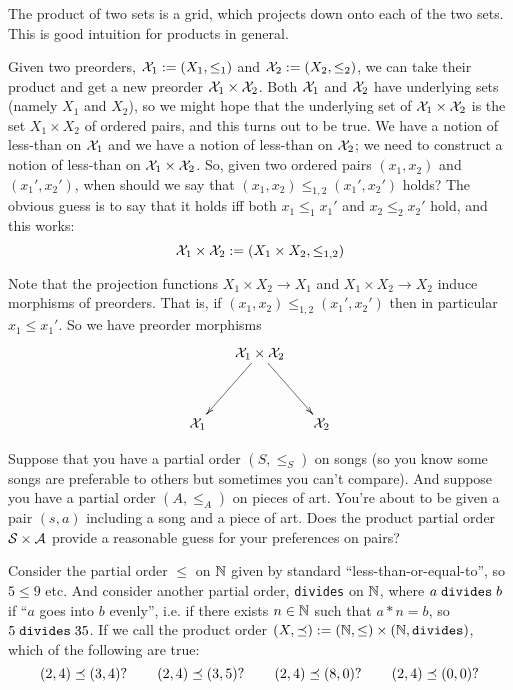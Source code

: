 
\subsubsection{}

The product of two sets is a grid, which projects down onto each of the two sets. This is good intuition for products in general.

\begin{example}\label{ex:product of preorders}

Given two preorders, $\mathcal{X}_1:=(X_1,\leq_1)$ and $\mathcal{X}_2:=(X_2,\leq_2)$, we can take their product and get a new preorder $\mathcal{X}_1\times\mathcal{X}_2$. Both $\mathcal{X}_1$ and $\mathcal{X}_2$ have underlying sets (namely $X_1$ and $X_2$), so we might hope that the underlying set of $\mathcal{X}_1\times\mathcal{X}_2$ is the set $X_1\times X_2$ of ordered pairs, and this turns out to be true. We have a notion of less-than on $\mathcal{X}_1$ and we have a notion of less-than on $\mathcal{X}_2$; we need to construct a notion of less-than on $\mathcal{X}_1\times\mathcal{X}_2$. So, given two ordered pairs $(x_1,x_2)$ and $(x_1',x_2')$, when should we say that $(x_1,x_2)\leq_{1,2}(x_1',x_2')$ holds? The obvious guess is to say that it holds iff both $x_1\leq_1x_1'$ and $x_2\leq_2x_2'$ hold, and this works:
$$\mathcal{X}_1\times\mathcal{X}_2:=(X_1\times X_2,\leq_{1,2})$$

Note that the projection functions $X_1\times X_2\to X_1$ and $X_1\times X_2\to X_2$ induce morphisms of preorders. That is, if $(x_1,x_2)\leq_{1,2}(x_1',x_2')$ then in particular $x_1\leq x_1'$. So we have preorder morphisms
$$\xymatrix@=15pt{&\mcX_1\times\mcX_2\ar[ldd]\ar[rdd]\\\\\mcX_1&&\mcX_2}$$

\end{example}

\begin{exercise}
Suppose that you have a partial order $(S,\leq_S)$ on songs (so you know some songs are preferable to others but sometimes you can't compare). And suppose you have a partial order $(A,\leq_A)$ on pieces of art. You're about to be given a pair $(s,a)$ including a song and a piece of art. Does the product partial order $\mathcal{S}\times\mathcal{A}$ provide a reasonable guess for your preferences on pairs?  
\end{exercise}

\begin{exercise}\label{exc:divides as po}
Consider the partial order $\leq$ on ${\mathbb N}$ given by standard “less-than-or-equal-to”, so $5\leq 9$ etc. And consider another partial order, {\tt divides} on ${\mathbb N}$, where $a\;{\tt divides}\;b$ if “$a$ goes into $b$ evenly”, i.e. if there exists $n\in{\mathbb N}$ such that $a*n=b$, so $5\;{\tt divides}\;35$. If we call the product order $(X,\preceq):=({\mathbb N},\leq)\times({\mathbb N},{\tt divides})$, which of the following are true: 
$$(2,4)\preceq(3,4)? \hspace{.3in} (2,4)\preceq(3,5)?\hspace{.3in} (2,4)\preceq (8,0)?\hspace{.3in} (2,4)\preceq(0,0)?$$
\end{exercise}

